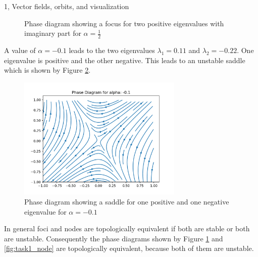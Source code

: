 \documentclass[10pt,a4paper]{article}
\begin{document}
\begin{task}{1, Vector fields, orbits, and visualization}
\begin{figure}[H]
    \caption{Phase diagram showing a focus for two positive eigenvalues with imaginary part for $\alpha = \frac{1}{2}$}
    \label{fig:task1_focus}
\end{figure}
A value of $\alpha=-0.1$ leads to the two eigenvalues $\lambda_1 = 0.11$ and $\lambda_2=-0.22$. One eigenvalue is positive and the other negative. This leads to an unstable saddle which is shown by Figure \ref{fig:task1_saddle}.
\begin{figure}[H]
    \centering
    \includegraphics[width=0.7\textwidth]{../plots/saddle.png}
    \caption{Phase diagram showing a saddle for one positive and one negative eigenvalue for $\alpha = -0.1$}
    \label{fig:task1_saddle}
\end{figure}
In general foci and nodes are topologically equivalent if both are stable or both are unstable. Consequently the phase diagrams shown by Figure \ref{fig:task1_focus} and \ref{fig:task1_node} are topologically equivalent, because both of them are unstable. \cite{Kuznetsov:1998:EAB:289919}
\end{task}
\end{document}
